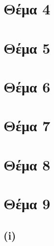 \documentclass[a4paper, 11pt]{article}
\newcommand{\lt}{\latintext}
\begin{document}
\newpage


\section*{Θέμα 4}

\section*{Θέμα 5}


\newpage
\section*{Θέμα 6}

\newpage


\section*{Θέμα 7}

\section*{Θέμα 8}

\newpage


\section*{Θέμα 9}
\subsection*{{\lt (i)}}
\end{document}

